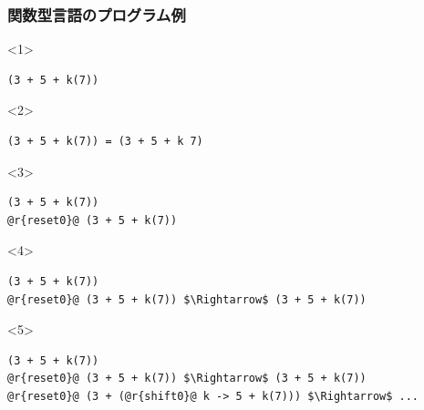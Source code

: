 \documentclass[dvipdfmx,cjk,xcolor=dvipsnames,envcountsect,notheorems,12pt]{beamer}
\theoremstyle{definition}
\begin{document}
\begin{frame}[fragile]
  \frametitle{関数型言語のプログラム例}
  \begin{onlyenv}<1>
\begin{lstlisting}
(3 + 5 + k(7))
\end{lstlisting}
  \end{onlyenv}
  \pause

  \begin{onlyenv}<2>
\begin{lstlisting}
(3 + 5 + k(7)) = (3 + 5 + k 7)
\end{lstlisting}
  \end{onlyenv}
  \pause

  \begin{onlyenv}<3>
\begin{lstlisting}
(3 + 5 + k(7))
@r{reset0}@ (3 + 5 + k(7))
\end{lstlisting}
  \end{onlyenv}
  \pause

  \begin{onlyenv}<4>
\begin{lstlisting}
(3 + 5 + k(7))
@r{reset0}@ (3 + 5 + k(7)) $\Rightarrow$ (3 + 5 + k(7))
\end{lstlisting}
  \end{onlyenv}
  \pause

  \begin{onlyenv}<5>
\begin{lstlisting}
(3 + 5 + k(7))
@r{reset0}@ (3 + 5 + k(7)) $\Rightarrow$ (3 + 5 + k(7))
@r{reset0}@ (3 + (@r{shift0}@ k -> 5 + k(7))) $\Rightarrow$ ...
\end{lstlisting}
  \end{onlyenv}

\end{frame}
\end{document}

